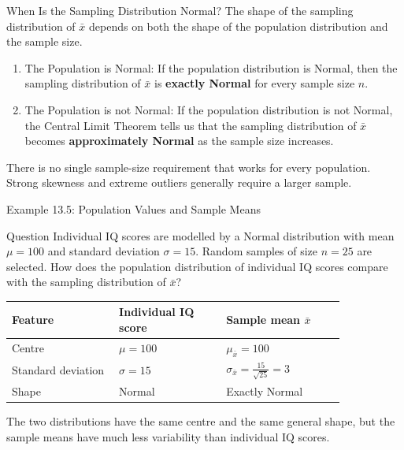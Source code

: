\documentclass[aspectratio=169]{beamer}
\begin{document}
\begin{frame}{When Is the Sampling Distribution Normal?}
The shape of the sampling distribution of $\bar{x}$ depends on both the shape of the population distribution and the sample size.
\begin{enumerate}
	\item The Population is Normal: If the population distribution is Normal, then the sampling distribution of $\bar{x}$ is \textbf{exactly Normal} for every sample size $n$.
	\item The Population is not Normal: If the population distribution is not Normal, the Central Limit Theorem tells us that the sampling distribution of $\bar{x}$ becomes \textbf{approximately Normal} as the sample size increases.
\end{enumerate}

There is no single sample-size requirement that works for every population. Strong skewness and extreme outliers generally require a larger sample.
\end{frame}

\begin{frame}{Example 13.5: Population Values and Sample Means}
\begin{block}{Question}
Individual IQ scores are modelled by a Normal distribution with mean $\mu=100$ and standard deviation $\sigma=15$. Random samples of size $n=25$ are selected. How does the population distribution of individual IQ scores compare with the sampling distribution of $\bar{x}$?
\end{block}

\begin{center}
\begin{tabular}{
  >{\RaggedRight\arraybackslash}p{0.27\linewidth}
  >{\centering\arraybackslash}p{0.27\linewidth}
  >{\centering\arraybackslash}p{0.30\linewidth}}
\toprule
Feature & Individual IQ score & Sample mean $\bar{x}$ \\
\midrule
Centre & $\mu=100$ & $\mu_{\bar{x}}=100$ \\[1mm]
Standard deviation & $\sigma=15$ &
$\displaystyle \sigma_{\bar{x}}
=\frac{15}{\sqrt{25}}=3$ \\[3mm]
Shape & Normal & Exactly Normal \\
\bottomrule
\end{tabular}
\end{center}

The two distributions have the same centre and the same general shape, but the sample means have much less variability than individual IQ scores.
\end{frame}
\end{document}
